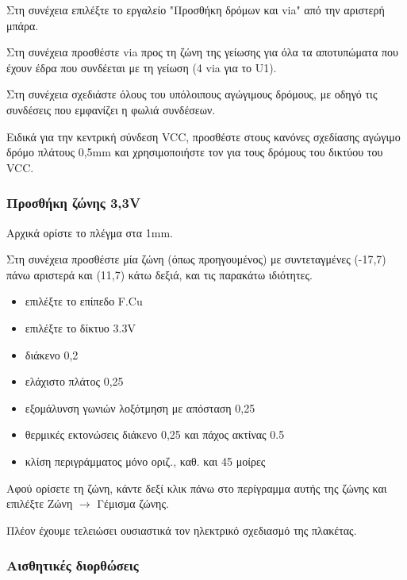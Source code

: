 \documentclass[a4paper]{article}
\begin{document}
Στη συνέχεια επιλέξτε το εργαλείο "Προσθήκη δρόμων και via" από την αριστερή μπάρα.

Στη συνέχεια προσθέστε via προς τη ζώνη της γείωσης για όλα τα αποτυπώματα που έχουν έδρα που συνδέεται με τη γείωση (4 via για το U1). 


Στη συνέχεια σχεδιάστε όλους του υπόλοιπους αγώγιμους δρόμους, με οδηγό τις συνδέσεις που εμφανίζει η φωλιά συνδέσεων.

Ειδικά για την κεντρική σύνδεση VCC, προσθέστε στους κανόνες σχεδίασης αγώγιμο δρόμο πλάτους 0,5mm και χρησιμοποιήστε τον για τους δρόμους του δικτύου του VCC.



\subsubsection{Προσθήκη ζώνης 3,3V}

Αρχικά ορίστε το πλέγμα στα 1mm.

Στη συνέχεια προσθέστε μία ζώνη (όπως προηγουμένος) με συντεταγμένες (-17,7) πάνω αριστερά και (11,7) κάτω δεξιά, και τις παρακάτω ιδιότητες.

\begin{itemize}
    \item επιλέξτε το επίπεδο F.Cu
    \item επιλέξτε το δίκτυο 3.3V
    \item διάκενο 0,2
    \item ελάχιστο πλάτος 0,25
    \item εξομάλυνση γωνιών λοξότμηση με απόσταση 0,25
    \item θερμικές εκτονώσεις διάκενο 0,25 και πάχος ακτίνας 0.5
    \item κλίση περιγράμματος μόνο οριζ., καθ. και 45 μοίρες
\end{itemize}

Αφού ορίσετε τη ζώνη, κάντε δεξί κλικ πάνω στο περίγραμμα αυτής της ζώνης και επιλέξτε Ζώνη $\rightarrow$ Γέμισμα ζώνης.

Πλέον έχουμε τελειώσει ουσιαστικά τον ηλεκτρικό σχεδιασμό της πλακέτας.


\subsubsection{Αισθητικές διορθώσεις}
\end{document}
